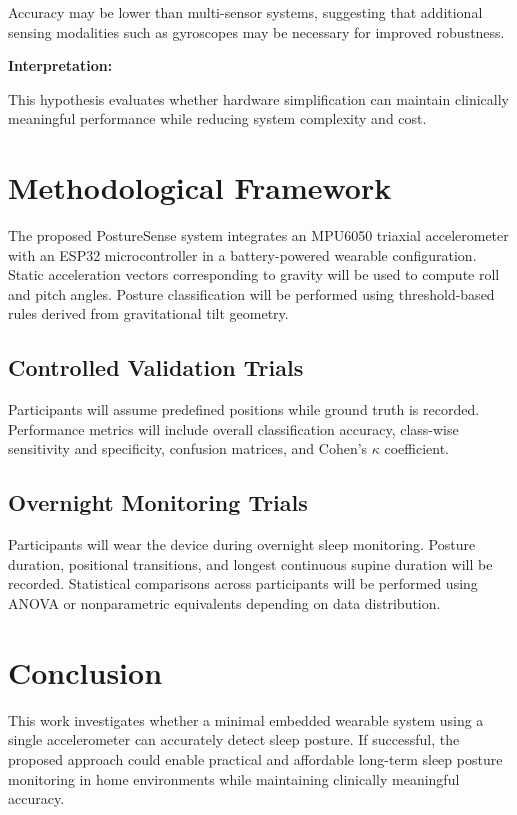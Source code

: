 \documentclass[10pt,journal]{IEEEtran}
\begin{document}
Accuracy may be lower than multi-sensor systems, suggesting that additional sensing modalities such as gyroscopes may be necessary for improved robustness.

\textbf{Interpretation:}

This hypothesis evaluates whether hardware simplification can maintain clinically meaningful performance while reducing system complexity and cost.

\section{Methodological Framework}

The proposed PostureSense system integrates an MPU6050 triaxial accelerometer with an ESP32 microcontroller in a battery-powered wearable configuration. Static acceleration vectors corresponding to gravity will be used to compute roll and pitch angles. Posture classification will be performed using threshold-based rules derived from gravitational tilt geometry.

\subsection{Controlled Validation Trials}

Participants will assume predefined positions while ground truth is recorded. Performance metrics will include overall classification accuracy, class-wise sensitivity and specificity, confusion matrices, and Cohen's $\kappa$ coefficient.

\subsection{Overnight Monitoring Trials}

Participants will wear the device during overnight sleep monitoring. Posture duration, positional transitions, and longest continuous supine duration will be recorded. Statistical comparisons across participants will be performed using ANOVA or nonparametric equivalents depending on data distribution.

\section{Conclusion}

This work investigates whether a minimal embedded wearable system using a single accelerometer can accurately detect sleep posture. If successful, the proposed approach could enable practical and affordable long-term sleep posture monitoring in home environments while maintaining clinically meaningful accuracy.
\end{document}
